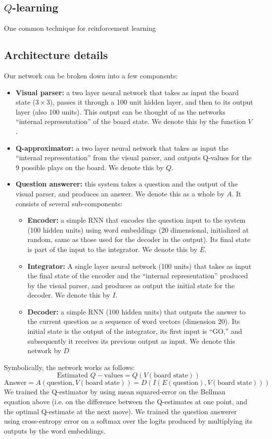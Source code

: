\documentclass{article} %
\begin{document}
\subsection{\(Q\)-learning}
One common technique for reinforcement learning
\subsection{Architecture details}
Our network can be broken down into a few components: 
\begin{itemize}
\item \textbf{Visual parser:} a two layer neural network that takes as input the board state (\(3 \times 3\)), passes it through a 100 unit hidden layer, and then to its output layer (also 100 units). This output can be thought of as the networks ``internal representation'' of the board state. We denote this by the function \(V\). 
\item \textbf{Q-approximator:} a two layer neural network that takes as input the ``internal representation'' from the visual parser, and outputs Q-values for the 9 possible plays on the board. We denote this by \(Q\). 
\item \textbf{Question answerer:} this system takes a question and the output of the visual parser, and produces an answer. We denote this as a whole by \(A\). It consists of several sub-components:
    \begin{itemize}
	\item \textbf{Encoder:} a simple RNN that encodes the question input to the system (100 hidden units) using word embeddings (20 dimensional, initialized at random, same as those used for the decoder in the output). Its final state is part of the input to the integrator. We denote this by \(E\).
	\item \textbf{Integrator:} A single layer neural network (100 units) that takes as input the final state of the encoder and the ``internal representation'' produced by the visual parser, and produces as output the initial state for the decoder. We denote this by \(I\).
	\item \textbf{Decoder:} a simple RNN (100 hidden units) that outputs the answer to the current question as a sequence of word vectors (dimension 20). Its initial state is the output of the integrator, its first input is ``GO,'' and subsequently it receives its previous output as input. We denote this network by \(D\)
    \end{itemize} 
\end{itemize}
Symbolically, the network works as follows:
\[ 
\text{Estimated } Q-\text{values} = Q(V(\text{board state}))
\]
\[ 
\text{Answer} = A(\text{question},V(\text{board state})) = D(I(E(\text{question}),V(\text{board state})) )
\]
We trained the Q-estimator by using mean squared-error on the Bellman equation above (i.e. on the difference between the Q-estimates at one point, and the optimal Q-estimate at the next move). We trained the question answerer using cross-entropy error on a softmax over the logits produced by multiplying its outputs by the word embeddings.
\end{document}
